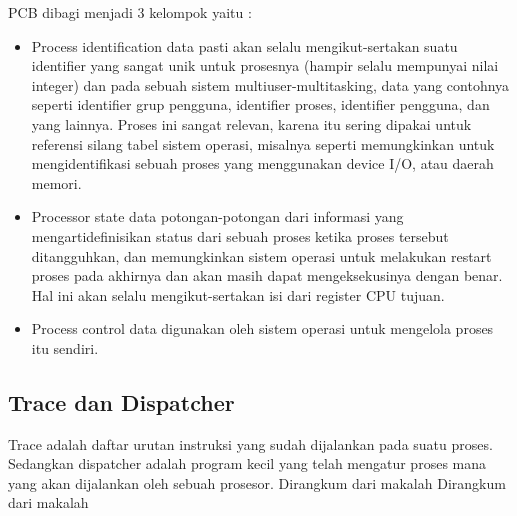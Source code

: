 	
	PCB dibagi menjadi 3 kelompok yaitu :
	\begin{itemize}
		\item Process identification data
		pasti akan selalu mengikut-sertakan suatu identifier yang sangat unik untuk prosesnya (hampir selalu mempunyai nilai integer) dan pada sebuah sistem multiuser-multitasking, data yang contohnya seperti identifier grup pengguna, identifier proses, identifier pengguna, dan yang lainnya. Proses ini sangat relevan, karena itu sering dipakai untuk referensi silang tabel sistem operasi, misalnya seperti memungkinkan untuk mengidentifikasi sebuah proses yang menggunakan device I/O, atau daerah memori.
		\item Processor state data
		potongan-potongan dari informasi yang mengartidefinisikan status dari sebuah proses ketika proses tersebut ditangguhkan, dan memungkinkan sistem operasi untuk melakukan restart proses pada akhirnya dan akan masih dapat mengeksekusinya dengan benar. Hal ini akan selalu mengikut-sertakan isi dari register CPU tujuan.
		\item Process control data
		digunakan oleh sistem operasi untuk mengelola proses itu sendiri.
	\end{itemize}

	\subsection{Trace dan Dispatcher}
	Trace adalah daftar urutan instruksi yang sudah  dijalankan pada suatu proses. Sedangkan dispatcher adalah program kecil yang telah mengatur proses mana yang akan dijalankan oleh sebuah  prosesor.
Dirangkum dari makalah \cite{apriyanto2009sistem}
Dirangkum dari makalah \cite{silberschatz2014operating}